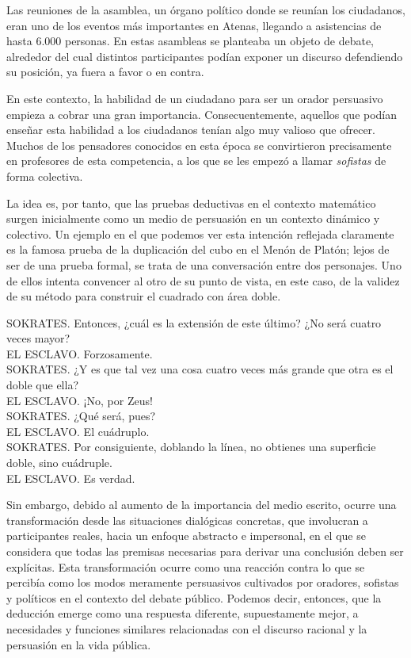 \documentclass{article}
\begin{document}
Las reuniones de la asamblea, un órgano político donde se reunían los ciudadanos, eran uno de los eventos más importantes en Atenas, llegando a asistencias de hasta 6.000 personas. En estas asambleas se planteaba un objeto de debate, alrededor del cual distintos participantes podían exponer un discurso defendiendo su posición, ya fuera a favor o en contra.

En este contexto, la habilidad de un ciudadano para ser un orador persuasivo empieza a cobrar una gran importancia. Consecuentemente, aquellos que podían enseñar esta habilidad a los ciudadanos tenían algo muy valioso que ofrecer. Muchos de los pensadores conocidos en esta época se convirtieron precisamente en profesores de esta competencia, a los que se les empezó a llamar \textit{sofistas} de forma colectiva.

La idea es, por tanto, que las pruebas deductivas en el contexto matemático surgen inicialmente como un medio de persuasión en un contexto dinámico y colectivo. Un ejemplo en el que podemos ver esta intención reflejada claramente es la famosa prueba de la duplicación del cubo en el Menón de Platón\cite{novaes2020dialogical}; lejos de ser de una prueba formal, se trata de una conversación entre dos personajes. Uno de ellos intenta convencer al otro de su punto de vista, en este caso, de la validez de su método para construir el cuadrado con área doble.

\begin{displayquote}
SOKRATES. Entonces, ¿cuál es la extensión de este último? ¿No será cuatro veces mayor?\\
EL ESCLAVO. Forzosamente.\\
SOKRATES. ¿Y es que tal vez una cosa cuatro veces más grande que otra es el doble que ella?\\
EL ESCLAVO. ¡No, por Zeus!\\
SOKRATES. ¿Qué será, pues?\\
EL ESCLAVO. El cuádruplo.\\
SOKRATES. Por consiguiente, doblando la línea, no obtienes una superficie doble, sino cuádruple.\\
EL ESCLAVO. Es verdad.\cite{bergua1958dialogos}
\end{displayquote}

Sin embargo, debido al aumento de la importancia del medio escrito, ocurre una transformación desde las situaciones dialógicas concretas, que involucran a participantes reales, hacia un enfoque abstracto e impersonal, en el que se considera que todas las premisas necesarias para derivar una conclusión deben ser explícitas. Esta transformación ocurre como una reacción contra lo que se percibía como los modos meramente persuasivos cultivados por oradores, sofistas y políticos en el contexto del debate público. Podemos decir, entonces, que la deducción emerge como una respuesta diferente, supuestamente mejor, a necesidades y funciones similares relacionadas con el discurso racional y la persuasión en la vida pública\cite{novaes2020dialogical}.
\end{document}
